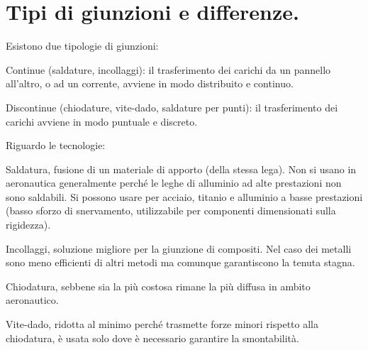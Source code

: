 \section{Tipi di giunzioni e differenze.}


Esistono due tipologie di giunzioni:
\begin{compactitem}
    \item Continue (saldature, incollaggi): il trasferimento dei carichi da un pannello all'altro, o ad un corrente, avviene in modo distribuito e continuo.\\
    \item Discontinue (chiodature, vite-dado, saldature per punti): il trasferimento dei carichi avviene in modo puntuale e discreto.
\end{compactitem}

Riguardo le tecnologie:
\begin{compactitem}
    \item Saldatura, fusione di un materiale di apporto (della stessa lega). Non si usano in aeronautica generalmente perché le leghe di alluminio ad alte prestazioni non sono saldabili. Si possono usare per acciaio, titanio e alluminio a basse prestazioni (basso sforzo di snervamento, utilizzabile per componenti dimensionati sulla rigidezza).\\
    \item Incollaggi, soluzione migliore per la giunzione di compositi. Nel caso dei metalli sono meno efficienti di altri metodi ma comunque garantiscono la tenuta stagna.\\
    \item Chiodatura, sebbene sia la più costosa rimane la più diffusa in ambito aeronautico.\\
    \item Vite-dado, ridotta al minimo perché trasmette forze minori rispetto alla chiodatura, è usata solo  dove è necessario garantire la smontabilità.
\end{compactitem}

